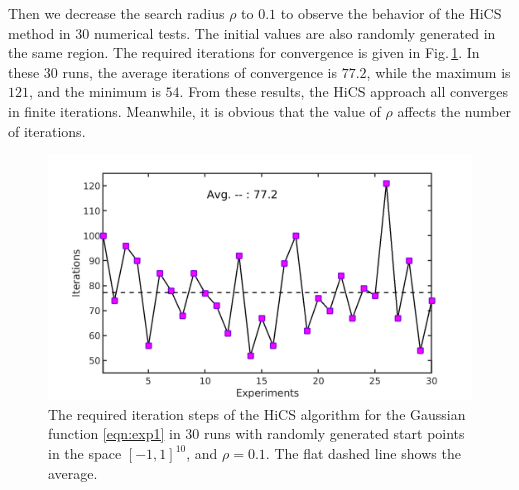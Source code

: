 Then we decrease the search radius $\rho$ to $0.1$ to observe the
behavior of the HiCS method in $30$ numerical tests. 
The initial values are also randomly generated in the same region.  
The required iterations for convergence is given in
Fig.\,\ref{fig:exp1:randInitr0_1}.
In these $30$ runs, the average iterations of convergence is
$77.2$, while the maximum is $121$, and the minimum is $54$.
From these results, the HiCS approach all converges in
finite iterations. Meanwhile, it is obvious that the value of
$\rho$ affects the number of iterations. 
\begin{figure}[!htbp]
	\centering
	  \includegraphics[scale=0.2]{../figures/gauss10Drandr0_1.png}
	  \caption{
	  The required iteration steps of the 
	  HiCS algorithm for the Gaussian function
	  \eqref{eqn:exp1} in $30$ runs with randomly generated start points
	  in the space $[-1, 1]^{10}$, and $\rho=0.1$. 
	  The flat dashed line shows the average.} 
	  \label{fig:exp1:randInitr0_1}
\end{figure}



